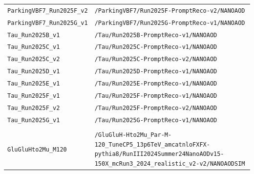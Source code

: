 \begin{longtable}{@{}>{\RaggedRight\arraybackslash}p{} >{\RaggedRight\arraybackslash}p{}@{}}
\addlinespace[2pt]
\texttt{ParkingVBF7\_\allowbreak{}Run2025F\_\allowbreak{}v2} & \texttt{/\allowbreak{}ParkingVBF7/\allowbreak{}Run2025F-\allowbreak{}PromptReco-\allowbreak{}v2/\allowbreak{}NANOAOD} \\
\addlinespace[2pt]
\texttt{ParkingVBF7\_\allowbreak{}Run2025G\_\allowbreak{}v1} & \texttt{/\allowbreak{}ParkingVBF7/\allowbreak{}Run2025G-\allowbreak{}PromptReco-\allowbreak{}v1/\allowbreak{}NANOAOD} \\
\addlinespace[2pt]
\texttt{Tau\_\allowbreak{}Run2025B\_\allowbreak{}v1} & \texttt{/\allowbreak{}Tau/\allowbreak{}Run2025B-\allowbreak{}PromptReco-\allowbreak{}v1/\allowbreak{}NANOAOD} \\
\addlinespace[2pt]
\texttt{Tau\_\allowbreak{}Run2025C\_\allowbreak{}v1} & \texttt{/\allowbreak{}Tau/\allowbreak{}Run2025C-\allowbreak{}PromptReco-\allowbreak{}v1/\allowbreak{}NANOAOD} \\
\addlinespace[2pt]
\texttt{Tau\_\allowbreak{}Run2025C\_\allowbreak{}v2} & \texttt{/\allowbreak{}Tau/\allowbreak{}Run2025C-\allowbreak{}PromptReco-\allowbreak{}v2/\allowbreak{}NANOAOD} \\
\addlinespace[2pt]
\texttt{Tau\_\allowbreak{}Run2025D\_\allowbreak{}v1} & \texttt{/\allowbreak{}Tau/\allowbreak{}Run2025D-\allowbreak{}PromptReco-\allowbreak{}v1/\allowbreak{}NANOAOD} \\
\addlinespace[2pt]
\texttt{Tau\_\allowbreak{}Run2025E\_\allowbreak{}v1} & \texttt{/\allowbreak{}Tau/\allowbreak{}Run2025E-\allowbreak{}PromptReco-\allowbreak{}v1/\allowbreak{}NANOAOD} \\
\addlinespace[2pt]
\texttt{Tau\_\allowbreak{}Run2025F\_\allowbreak{}v1} & \texttt{/\allowbreak{}Tau/\allowbreak{}Run2025F-\allowbreak{}PromptReco-\allowbreak{}v1/\allowbreak{}NANOAOD} \\
\addlinespace[2pt]
\texttt{Tau\_\allowbreak{}Run2025F\_\allowbreak{}v2} & \texttt{/\allowbreak{}Tau/\allowbreak{}Run2025F-\allowbreak{}PromptReco-\allowbreak{}v2/\allowbreak{}NANOAOD} \\
\addlinespace[2pt]
\texttt{Tau\_\allowbreak{}Run2025G\_\allowbreak{}v1} & \texttt{/\allowbreak{}Tau/\allowbreak{}Run2025G-\allowbreak{}PromptReco-\allowbreak{}v1/\allowbreak{}NANOAOD} \\
\addlinespace[2pt]
\addlinespace[4pt]
\multicolumn{2}{@{}l}{\bfseries Simulation (177 samples)} \\
\addlinespace[2pt]
\texttt{GluGluHto2Mu\_\allowbreak{}M120} & \texttt{/\allowbreak{}GluGluH-\allowbreak{}Hto2Mu\_\allowbreak{}Par-\allowbreak{}M-\allowbreak{}120\_\allowbreak{}TuneCP5\_\allowbreak{}13p6TeV\_\allowbreak{}amcatnloFXFX-\allowbreak{}pythia8/\allowbreak{}RunIII2024Summer24NanoAODv15-\allowbreak{}150X\_\allowbreak{}mcRun3\_\allowbreak{}2024\_\allowbreak{}realistic\_\allowbreak{}v2-\allowbreak{}v2/\allowbreak{}NANOAODSIM} \\

\end{longtable}
